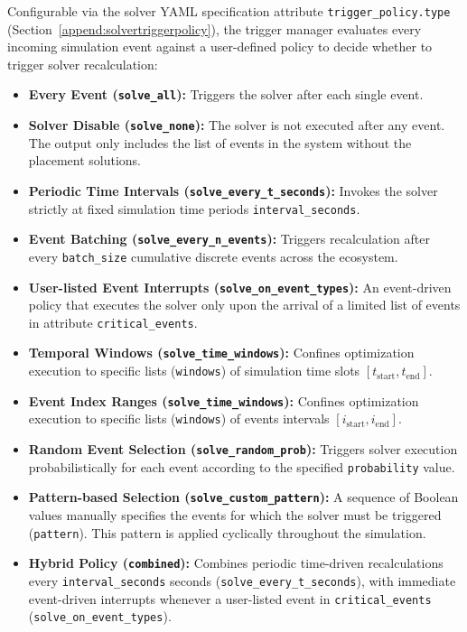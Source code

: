 \documentclass[ASNA]{USG} %
\begin{document}
Configurable via the solver YAML specification attribute \texttt{trigger\_policy.type} (Section~\ref{append:solvertriggerpolicy}), the trigger manager evaluates every incoming simulation event against a user-defined policy to decide whether to trigger solver recalculation:
\begin{itemize}
    \item \textbf{Every Event (\texttt{solve\_all}):} Triggers the solver after each single event.
    \item \textbf{Solver Disable (\texttt{solve\_none}):} The solver is not executed after any event. The output only includes the list of events in the system without the placement solutions.
    \item \textbf{Periodic Time Intervals (\texttt{solve\_every\_t\_seconds}):} Invokes the solver strictly at fixed simulation time periods \texttt{interval\_seconds}.
    \item \textbf{Event Batching (\texttt{solve\_every\_n\_events}):} Triggers recalculation after every \texttt{batch\_size} cumulative discrete events across the ecosystem.
    \item \textbf{User-listed Event Interrupts (\texttt{solve\_on\_event\_types}):} An event-driven policy that executes the solver only upon the arrival of a limited list of events in attribute \texttt{critical\_events}.
    \item \textbf{Temporal Windows (\texttt{solve\_time\_windows}):} Confines optimization execution to specific lists (\texttt{windows}) of simulation time slots $[t_{\text{start}}, t_{\text{end}}]$.
    \item \textbf{Event Index Ranges (\texttt{solve\_time\_windows}):} Confines optimization execution to specific lists (\texttt{windows}) of events intervals $[i_{\text{start}}, i_{\text{end}}]$.
    \item \textbf{Random Event Selection (\texttt{solve\_random\_prob}):} Triggers solver execution probabilistically for each event according to the specified \texttt{probability} value.
    \item \textbf{Pattern-based Selection (\texttt{solve\_custom\_pattern}):} A sequence of Boolean values manually specifies the events for which the solver must be triggered (\texttt{pattern}). This pattern is applied cyclically throughout the simulation.
    \item \textbf{Hybrid Policy (\texttt{combined}):} Combines periodic time-driven recalculations every \texttt{interval\_seconds} seconds (\texttt{solve\_every\_t\_seconds}), with immediate event-driven interrupts whenever a user-listed event in \texttt{critical\_events} (\texttt{solve\_on\_event\_types}).
\end{itemize}
\end{document}
